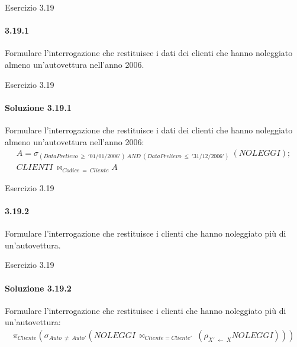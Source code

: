 \begin{frame}{Esercizio 3.19}
    \framesubtitle{3.19.1}
    \vspace{-3.cm}
    \vspace{.3cm}

    Formulare l'interrogazione che restituisce i dati dei clienti che hanno noleggiato almeno un'autovettura nell'anno 2006.
\end{frame}
%
\begin{frame}{Esercizio 3.19}
    \framesubtitle{Soluzione 3.19.1}
    \vspace*{-2cm}
    \vspace{.3cm}

    {\small Formulare l'interrogazione che restituisce i dati dei clienti che hanno noleggiato almeno un'autovettura nell'anno 2006:}
    \small
    \begin{gather*}
        A = \sigma_{(DataPrelievo~\geq~'01/01/2006')~AND~(DataPrelievo~\leq~'31/12/2006')}~(NOLEGGI);\\
        CLIENTI~\bowtie_{Codice~=~Cliente} A
    \end{gather*}
\end{frame}
%
\begin{frame}{Esercizio 3.19}
    \framesubtitle{3.19.2}
    \vspace{-3.cm}
    \vspace{.3cm}

    Formulare l'interrogazione che restituisce i clienti che hanno noleggiato pi\`u di un'autovettura.
\end{frame}
%
\begin{frame}{Esercizio 3.19}
    \framesubtitle{Soluzione 3.19.2}
    \vspace*{-2cm}
    \vspace{.3cm}

    {\small Formulare l'interrogazione che restituisce i clienti che hanno noleggiato pi\`u di un'autovettura:}
    \small
    \begin{gather*}
        \pi_{Cliente} (\sigma_{Auto~\neq~Auto'} (NOLEGGI~\bowtie_{Cliente=Cliente'}~(\rho_{X'~\leftarrow~X} NOLEGGI)))
    \end{gather*}
\end{frame}
%
